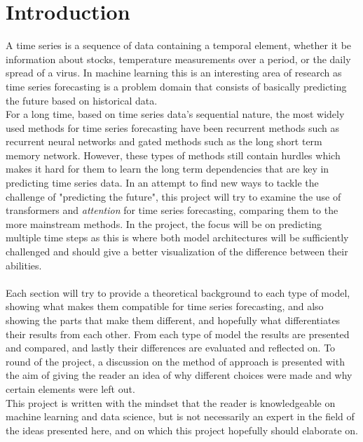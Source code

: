\documentclass[main.tex]{subfiles}
\begin{document}
\section{Introduction}

A time series is a sequence of data containing a temporal element, whether it be information about stocks, temperature measurements over a period, or the daily spread of a virus. In machine learning this is an interesting area of research as time series forecasting is a problem domain that consists of basically predicting the future based on historical data.\\
For a long time, based on time series data's sequential nature, the most widely used methods for time series forecasting have been recurrent methods such as recurrent neural networks and gated methods such as the long short term memory network. However, these types of methods still contain hurdles which makes it hard for them to learn the long term dependencies that are key in predicting time series data. In an attempt to find new ways to tackle the challenge of "predicting the future", this project will try to examine the use of transformers and \textit{attention} for time series forecasting, comparing them to the more mainstream methods. In the project, the focus will be on predicting multiple time steps as this is where both model architectures will be sufficiently challenged and should give a better visualization of the difference between their abilities. \\
\\
Each section will try to provide a theoretical background to each type of model, showing what makes them compatible for time series forecasting, and also showing the parts that make them different, and hopefully what differentiates their results from each other. From each type of model the results are presented and compared, and lastly their differences are evaluated and reflected on. To round of the project, a discussion on the method of approach is presented with the aim of giving the reader an idea of why different choices were made and why certain elements were left out.\\
This project is written with the mindset that the reader is knowledgeable on machine learning and data science, but is not necessarily an expert in the field of the ideas presented here, and on which this project hopefully should elaborate on.
\end{document}
